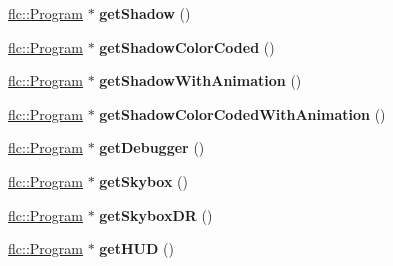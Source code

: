 \begin{DoxyCompactItemize}
\item 
\hyperlink{classflw_1_1flc_1_1Program}{flc\+::\+Program} $\ast$ {\bfseries get\+Shadow} ()\hypertarget{classflw_1_1flf_1_1ProgramLoader_a87d44fe1191e697ba5f5fed660afcc6e}{}\label{classflw_1_1flf_1_1ProgramLoader_a87d44fe1191e697ba5f5fed660afcc6e}

\item 
\hyperlink{classflw_1_1flc_1_1Program}{flc\+::\+Program} $\ast$ {\bfseries get\+Shadow\+Color\+Coded} ()\hypertarget{classflw_1_1flf_1_1ProgramLoader_a6b537cccbe0f77c6b187316c0ff74d23}{}\label{classflw_1_1flf_1_1ProgramLoader_a6b537cccbe0f77c6b187316c0ff74d23}

\item 
\hyperlink{classflw_1_1flc_1_1Program}{flc\+::\+Program} $\ast$ {\bfseries get\+Shadow\+With\+Animation} ()\hypertarget{classflw_1_1flf_1_1ProgramLoader_a338f20fadf31bf009c7aa5acea89d523}{}\label{classflw_1_1flf_1_1ProgramLoader_a338f20fadf31bf009c7aa5acea89d523}

\item 
\hyperlink{classflw_1_1flc_1_1Program}{flc\+::\+Program} $\ast$ {\bfseries get\+Shadow\+Color\+Coded\+With\+Animation} ()\hypertarget{classflw_1_1flf_1_1ProgramLoader_a4fdbb628ff66c7f141a2983d5bbbe814}{}\label{classflw_1_1flf_1_1ProgramLoader_a4fdbb628ff66c7f141a2983d5bbbe814}

\item 
\hyperlink{classflw_1_1flc_1_1Program}{flc\+::\+Program} $\ast$ {\bfseries get\+Debugger} ()\hypertarget{classflw_1_1flf_1_1ProgramLoader_a60cb94c2c636293f9b81421689d21d33}{}\label{classflw_1_1flf_1_1ProgramLoader_a60cb94c2c636293f9b81421689d21d33}

\item 
\hyperlink{classflw_1_1flc_1_1Program}{flc\+::\+Program} $\ast$ {\bfseries get\+Skybox} ()\hypertarget{classflw_1_1flf_1_1ProgramLoader_ad33d4736842e938a1df9d10ce437b689}{}\label{classflw_1_1flf_1_1ProgramLoader_ad33d4736842e938a1df9d10ce437b689}

\item 
\hyperlink{classflw_1_1flc_1_1Program}{flc\+::\+Program} $\ast$ {\bfseries get\+Skybox\+DR} ()\hypertarget{classflw_1_1flf_1_1ProgramLoader_ab8cde8cc10d18cfce0d15ed97679869d}{}\label{classflw_1_1flf_1_1ProgramLoader_ab8cde8cc10d18cfce0d15ed97679869d}

\item 
\hyperlink{classflw_1_1flc_1_1Program}{flc\+::\+Program} $\ast$ {\bfseries get\+H\+UD} ()\hypertarget{classflw_1_1flf_1_1ProgramLoader_ac8d0006a913cfabab7037d1cce307df4}{}\label{classflw_1_1flf_1_1ProgramLoader_ac8d0006a913cfabab7037d1cce307df4}


\end{DoxyCompactItemize}
